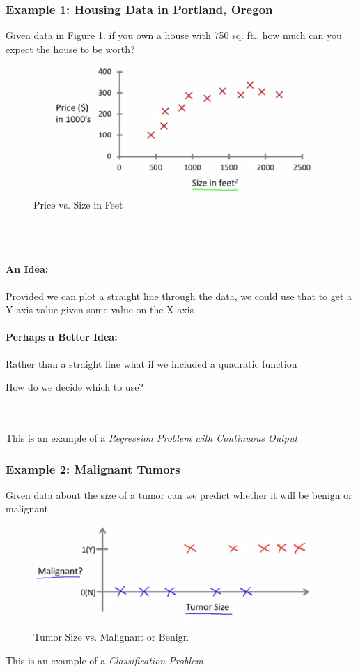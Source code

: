 \documentclass{article}
\begin{document}
		\subsubsection*{Example 1: Housing Data in Portland, Oregon}
		Given data in Figure 1. if you own a house with 750 sq. ft., how much can you expect the house to be worth?
		\begin{figure}[h!]
			\centering
			\includegraphics[width=0.7\linewidth]{screenshot001}
			\caption{Price vs. Size in Feet}
			\label{fig:screenshot001}
		\end{figure}
		\\\\\paragraph*{An Idea:} Provided we can plot a straight line through the data, we could use that to get a Y-axis value given some value on the X-axis
		\paragraph*{Perhaps a Better Idea:} Rather than a straight line what if we included a quadratic function
		\\\centerline{How do we decide which to use?}
		\\\\This is an example of a \emph{Regression Problem with Continuous Output}
		
		\subsubsection*{Example 2: Malignant Tumors}
		Given data about the size of a tumor can we predict whether it will be benign or malignant 
		\begin{figure}[h!]
			\centering
			\includegraphics[width=0.7\linewidth]{screenshot002}
			\caption{Tumor Size vs. Malignant or Benign}
			\label{fig:screenshot002}
		\end{figure}
		This is an example of a \emph{Classification Problem}
		
\end{document}
